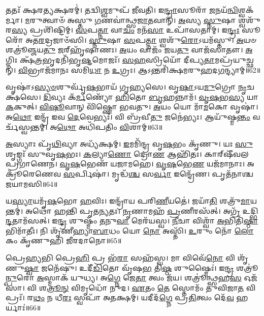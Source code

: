 𑌤𑌤𑌃᳴ 𑌕𑍍𑌷𑌰\-\ul{𑌤𑍍𑌯}\-𑌕𑍍𑌷𑌰𑌮𑍍॑।
𑌤𑌦𑍍𑌵𑌿\-\ul{𑌶𑍍𑌵}\-𑌮𑍁𑌪᳴ 𑌜𑍀𑌵𑌤𑌿।
𑌇\-\ul{𑌨𑍍𑌦𑍍𑌰𑌾}\-𑌸𑍂𑌰𑌾᳴ \ul{𑌜}\-𑌨𑌯᳴\-\ul{𑌨𑍍𑌵𑌿}\-𑌶𑍍𑌵𑌕᳴𑌰𑍍𑌮𑌾।
\-\ul{𑌮}\-𑌰𑍁𑌤𑍍𑌵𑌾𑍞᳴ 𑌅𑌸𑍍𑌤𑍁 \ul{𑌗}\-𑌣𑌵𑌾॑𑌨𑍍𑌥𑍍𑌸\-\ul{𑌜𑌾}\-𑌤𑌵𑌾𑌨𑍍᳴।
\-\ul{𑌅}\-𑌸𑍍𑌯 \ul{𑌸𑍍𑌨𑍁}\-𑌷𑌾 𑌶𑍍𑌵𑌶𑍁᳴𑌰\-\ul{𑌸𑍍𑌯} 𑌪𑍍𑌰𑌶𑌿᳴𑌷𑍍𑌟𑌿𑌮𑍍।
\-\ul{𑌸}\-𑌪\-\ul{𑌤𑍍𑌨𑌾} 𑌵𑌾\-\ul{𑌚𑌂} 𑌮𑌨᳴\-\ul{𑌸𑌾} 𑌉𑌪𑌾᳴𑌸𑌤𑌾𑌮𑍍।
𑌇\-\ul{𑌨𑍍𑌦𑍍𑌰𑌃} 𑌸𑍂𑌰𑍋᳴ 𑌅𑌤\-\ul{𑌰}\-𑌦𑍍𑌰𑌜𑌾𑍞᳴𑌸𑌿।
\-\ul{𑌸𑍍𑌨𑍁}\-𑌷𑌾 \ul{𑌸}\-𑌪\-\ul{𑌤𑍍𑌨𑌾} 𑌶𑍍𑌵𑌶𑍁᳴\-\ul{𑌰𑍋}\-\-𑌽𑌯𑌮᳴𑌸𑍍𑌤𑍁।
\-\ul{𑌅}\-𑌯𑍞 𑌶𑌤𑍍𑌰𑍂॑𑌞𑍍𑌜𑌯\-\ul{𑌤𑍁} 𑌜𑌰𑍍‌\mbox{}𑌹𑍃᳴𑌷𑌾𑌣𑌃।
\-\ul{𑌅}\-𑌯𑌂 𑌵𑌾𑌜𑌂᳴ 𑌜𑌯\-\ul{𑌤𑍁} 𑌵𑌾𑌜᳴𑌸𑌾𑌤𑍗।
\-\ul{𑌅}\-𑌗𑍍𑌨𑌿𑌃 𑌕𑍍𑌷᳴\-\ul{𑌤𑍍𑌰}\-𑌭𑍃𑌦𑌨𑌿᳴𑌭𑍃\-\ul{𑌷𑍍𑌟}\-𑌮𑍋𑌜𑌃᳴।
\-\ul{𑌸}\-\-\ul{𑌹}\-𑌸𑍍𑌰𑌿𑌯𑍋᳴ 𑌦𑍀𑌪𑍍𑌯\-\ul{𑌤𑌾}\-𑌮𑌪𑍍𑌰᳴𑌯𑍁𑌚𑍍𑌛𑌨𑍍।
\-\ul{𑌵𑌿}\-𑌭𑍍𑌰𑌾𑌜᳴𑌮𑌾𑌨𑌃 𑌸𑌮𑌿\-\ul{𑌧𑌾} 𑌨 \ul{𑌉}\-𑌗𑍍𑌰𑌃।
𑌆𑌽𑌨𑍍𑌤𑌰𑌿᳴𑌕𑍍𑌷𑌮𑌰𑍁\-\ul{𑌹}\-𑌦\-\ul{𑌗}\-𑌨𑍍𑌦𑍍𑌯𑌾𑌮𑍍॥62॥\anuvakamend[\-\ul{𑌧𑌾}\-𑌰𑌯᳴𑌨𑍍𑌪𑍁\-\ul{𑌰𑍋}\-𑌡𑌾\-\ul{𑌶𑌂} 𑌬𑍃\-\ul{𑌹}\-𑌸𑍍𑌪𑌤𑌿𑌂᳴ \ul{𑌜}\-𑌘𑌨᳴𑌚𑍍𑌯𑍁𑌤𑌿𑌮𑌾\-\ul{𑌨}\-𑌨𑍍𑌦𑍋 𑌭𑌗᳴𑌸𑍍𑌯 𑌤𑍃𑌪𑍍𑌯𑌾\-\ul{𑌣𑍍𑌯}\-𑌗𑍍𑌨𑍇𑌃 𑌪𑍃᳴\-\ul{𑌥𑌿}\-𑌵𑍀 𑌯𑌜𑍍𑌵᳴𑌨 𑌏𑌤𑍁 \ul{𑌪𑍍𑌰}\-𑌦𑌿\-\ul{𑌶}\-𑌶𑍍𑌚𑌤᳴\-\ul{𑌸𑍍𑌰𑍋} 𑌵𑌾𑌜᳴𑌸𑌾𑌤𑍗 \ul{𑌚}\-𑌤𑍍𑌵𑌾𑌰𑌿᳴ 𑌚]

𑌵𑍃𑌷𑌾॑\-𑌽\-\ul{𑌸𑍍𑌯}\-\-\ul{𑍞}\-𑌶𑍁𑌰𑍍𑌵𑍃᳴\-\ul{𑌷}\-𑌭𑌾𑌯᳴ 𑌗𑍃𑌹𑍍𑌯𑌸𑍇।
𑌵𑍃\-\ul{𑌷𑌾}\-\-𑌽𑌯\-\ul{𑌮𑍁}\-𑌗𑍍𑌰𑍋 \ul{𑌨𑍃}\-𑌚𑌕𑍍𑌷᳴𑌸𑍇।
\-\ul{𑌦𑌿}\-𑌵𑍍𑌯𑌃 𑌕᳴\-\ul{𑌰𑍍𑌮}\-𑌣𑍍𑌯𑍋᳴ \ul{𑌹𑌿}\-𑌤𑍋 \ul{𑌬𑍃}\-𑌹𑌨𑍍𑌨𑌾𑌮᳴।
\-\ul{𑌵𑍃}\-\-\ul{𑌷}\-𑌭\-\ul{𑌸𑍍𑌯} 𑌯𑌾 \ul{𑌕}\-𑌕𑍁𑌤𑍍।
\-\ul{𑌵𑌿}\-\-\ul{𑌷𑍂}\-𑌵𑌾𑌨𑍍 𑌵𑌿᳴𑌷𑍍𑌣𑍋 𑌭𑌵𑌤𑍁।
\-\ul{𑌅}\-𑌯𑌂 𑌯𑍋 𑌮𑌾᳴\-\ul{𑌮}\-𑌕𑍋 𑌵𑍃𑌷𑌾॑।
𑌅\-\ul{𑌥𑍋} 𑌇𑌨𑍍𑌦𑍍𑌰᳴ 𑌇𑌵 \ul{𑌦𑍇}\-𑌵𑍇𑌭𑍍𑌯𑌃᳴।
𑌵𑌿 𑌬𑍍𑌰᳴𑌵𑍀\-\ul{𑌤𑍁} 𑌜𑌨𑍇॑𑌭𑍍𑌯𑌃।
𑌆𑌯𑍁᳴𑌷𑍍𑌮\-\ul{𑌨𑍍𑌤𑌂} 𑌵𑌰𑍍𑌚᳴𑌸𑍍𑌵𑌨𑍍𑌤𑌮𑍍।
𑌅\-\ul{𑌥𑍋} 𑌅𑌧𑌿᳴𑌪𑌤𑌿𑌂 \ul{𑌵𑌿}\-𑌶𑌾𑌮𑍍॥63॥

\-\ul{𑌅}\-𑌸𑍍𑌯𑌾𑌃 𑌪𑍃᳴\-\ul{𑌥𑌿}\-𑌵𑍍𑌯𑌾 𑌅𑌧𑍍𑌯᳴𑌕𑍍𑌷𑌮𑍍।
\-\ul{𑌇}\-𑌮𑌮𑌿᳴𑌨𑍍𑌦𑍍𑌰 𑌵𑍃\-\ul{𑌷}\-𑌭𑌂 𑌕𑍃᳴𑌣𑍁।
𑌯𑌃 \ul{𑌸𑍁}\-𑌶𑍃𑌙𑍍𑌗𑌃᳴ 𑌸𑍁𑌵𑍃\-\ul{𑌷}\-𑌭𑌃।
\-\ul{𑌕}\-𑌲𑍍𑌯𑌾\-\ul{𑌣𑍋} 𑌦𑍍𑌰𑍋\-\ul{𑌣} 𑌆𑌹𑌿᳴𑌤𑌃।
𑌕𑌾𑌰𑍍‌\mbox{}𑌷𑍀᳴𑌵𑌲 𑌪𑍍𑌰𑌗𑌾𑌣𑍇𑌨।
\-\ul{𑌵𑍃}\-\-\ul{𑌷}\-𑌭𑍇𑌣᳴ 𑌯𑌜𑌾𑌮𑌹𑍇।
\-\ul{𑌵𑍃}\-\-\ul{𑌷}\-𑌭𑍇\-\ul{𑌣} 𑌯𑌜᳴𑌮𑌾𑌨𑌾𑌃।
𑌅𑌕𑍍𑌰𑍂᳴𑌰𑍇𑌣𑍇𑌵 \ul{𑌸}\-𑌰𑍍𑌪𑌿𑌷𑌾॑।
𑌮𑍃𑌦𑍍𑌧᳴\-\ul{𑌶𑍍𑌚} 𑌸\-\ul{𑌰𑍍𑌵𑌾} 𑌇𑌨𑍍𑌦𑍍𑌰𑍇᳴𑌣।
𑌪𑍃𑌤᳴𑌨𑌾𑌶𑍍𑌚 𑌜𑌯𑌾𑌮𑌸𑌿॥64॥

𑌯\-\ul{𑌸𑍍𑌯𑌾}\-𑌯𑌮𑍃᳴\-\ul{𑌷}\-𑌭𑍋 \ul{𑌹}\-𑌵𑌿𑌃।
𑌇𑌨𑍍𑌦𑍍𑌰𑌾᳴𑌯 𑌪𑌰𑌿\-\ul{𑌣𑍀}\-𑌯𑌤𑍇॑।
𑌜𑌯𑌾᳴\-\ul{𑌤𑌿} 𑌶𑌤𑍍𑌰𑍁᳴\-\ul{𑌮𑌾}\-𑌯𑌨𑍍𑌤𑌮𑍍॑।
𑌅𑌥𑍋᳴ 𑌹𑌨𑍍𑌤𑌿 𑌪𑍃𑌤\-\ul{𑌨𑍍𑌯}\-𑌤𑌃।
\-\ul{𑌨𑍃}\-𑌣𑌾𑌮𑌹᳴ \ul{𑌪𑍍𑌰}\-𑌣𑍀𑌰𑌸᳴𑌤𑍍।
𑌅𑌗𑍍𑌰᳴ 𑌉𑌦𑍍𑌭𑌿\-\ul{𑌨𑍍𑌦}\-𑌤𑌾𑌮᳴𑌸𑌤𑍍।
𑌇\-\ul{𑌨𑍍𑌦𑍍𑌰} 𑌶𑍁𑌷𑍍𑌮𑌂᳴ \ul{𑌤}\-𑌨𑍁\-\ul{𑌵𑌾} 𑌮𑍇𑌰᳴𑌯𑌸𑍍𑌵।
\-\ul{𑌨𑍀}\-𑌚𑌾 𑌵𑌿𑌶𑍍𑌵𑌾᳴ \ul{𑌅}\-𑌭𑌿𑌤𑌿᳴\-\ul{𑌷𑍍𑌠𑌾}\-𑌭𑌿𑌮𑌾᳴𑌤𑍀𑌃।
𑌨𑌿 𑌶𑍃᳴𑌣𑍀𑌹𑍍𑌯𑌾\-\ul{𑌬𑌾}\-𑌧𑌂 𑌯𑍋 \ul{𑌨𑍋} 𑌅𑌸𑍍𑌤𑌿᳴।
\-\ul{𑌉}\-𑌰𑍁𑌂 𑌨𑍋᳴ \ul{𑌲𑍋}\-𑌕𑌂 𑌕𑍃᳴𑌣𑍁𑌹𑌿 𑌜𑍀𑌰𑌦𑌾𑌨𑍋॥65॥

𑌪𑍍𑌰𑍇\-\ul{𑌹𑍍𑌯}\-𑌭𑌿 𑌪𑍍𑌰𑍇\-\ul{𑌹𑌿} 𑌪𑍍𑌰 𑌭᳴\-\ul{𑌰𑌾} 𑌸𑌹᳴𑌸𑍍𑌵।
𑌮𑌾 𑌵𑌿𑌵𑍇᳴\-\ul{𑌨𑍋} 𑌵𑌿 𑌶𑍃᳴𑌣𑍁\-\ul{𑌷𑍍𑌵𑌾} 𑌜𑌨𑍇᳴𑌷𑍁।
𑌉𑌦𑍀᳴\-\ul{𑌡𑌿}\-𑌤𑍋 𑌵𑍃᳴𑌷\-\ul{𑌭} 𑌤𑌿\-\ul{𑌷𑍍𑌠} 𑌶𑍁𑌷𑍍𑌮𑍈𑌃॑।
𑌇\-\ul{𑌨𑍍𑌦𑍍𑌰} 𑌶𑌤𑍍𑌰𑍂॑\-\ul{𑌨𑍍𑌪𑍁}\-𑌰𑍋 \ul{𑌅}\-𑌸𑍍𑌮𑌾𑌕᳴ 𑌯𑍁𑌧𑍍𑌯।
𑌅\-\ul{𑌗𑍍𑌨𑍇} 𑌜𑍇\-\ul{𑌤𑌾} 𑌤𑍍𑌵𑌂 𑌜᳴𑌯।
𑌶𑌤𑍍𑌰𑍂॑𑌨𑍍𑌥𑍍𑌸𑌹\-\ul{𑌸} 𑌓𑌜᳴𑌸𑌾।
𑌵𑌿 𑌶\-\ul{𑌤𑍍𑌰𑍂}\-\-\ul{𑌨𑍍} 𑌵𑌿𑌮𑍃𑌧𑍋᳴ 𑌨𑍁𑌦।
\-\ul{𑌏}\-𑌤𑌂 \ul{𑌤𑍇} 𑌸𑍍𑌤𑍋𑌮𑌂᳴ 𑌤𑍁𑌵𑌿𑌜𑌾\-\ul{𑌤} 𑌵𑌿𑌪𑍍𑌰𑌃᳴।
𑌰\-\ul{𑌥𑌂} 𑌨 𑌧𑍀\-\ul{𑌰𑌃} 𑌸𑍍𑌵𑌪𑌾᳴ 𑌅𑌤𑌕𑍍𑌷𑌮𑍍।
𑌯𑌦𑍀𑌦᳴\-\ul{𑌗𑍍𑌨𑍇} 𑌪𑍍𑌰\-\ul{𑌤𑌿}\-𑌤𑍍𑌵𑌂 𑌦𑍇᳴\-\ul{𑌵} 𑌹𑌰𑍍𑌯𑌾𑌃॑॥66॥

